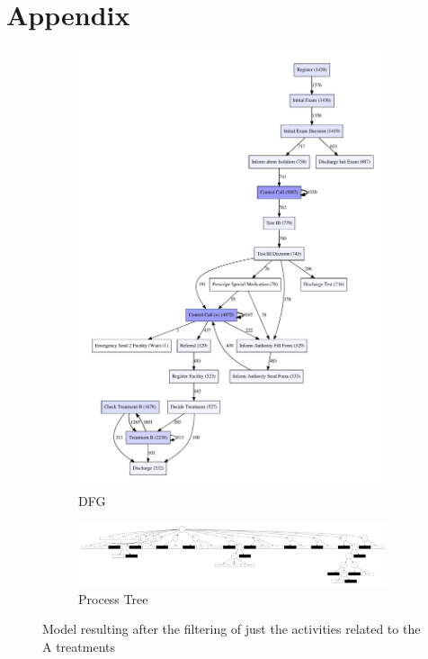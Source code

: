 \documentclass[12pt]{report}
\begin{document}
\newpage
    
\section*{Appendix}

\begin{figure}[h]
    \centering
    \begin{subfigure}[b]{0.2\textwidth}
        \centering
	\includegraphics[width=\textwidth]{figures/q1_d_silent_A.pdf}
        \caption{DFG}
        \label{fig:figures-q1_d_silent_A-pdf}
    \end{subfigure}
    \hfill
    \begin{subfigure}[b]{0.7\textwidth}
        \centering
	\includegraphics[width=\textwidth]{figures/q1_d_tree_silent_A.pdf}
        \caption{Process Tree}
        \label{fig:figures-q1_d_tree_silent_A-pdf}
    \end{subfigure}
    \hfill
    \caption{Model resulting after the filtering of just the activities related to the A treatments}
    \label{fig:dfg-pt-silent-A}
\end{figure}
\end{document}
